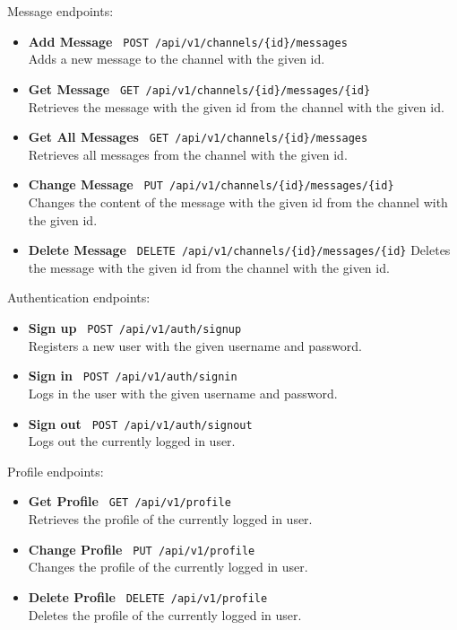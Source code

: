 \documentclass[a4paper,12pt]{article}
\begin{document}
	Message endpoints:
	\begin{itemize}
		\item \textbf{Add Message} \texttt{ POST /api/v1/channels/\{id\}/messages } \\
		Adds a new message to the channel with the given id.
		\item \textbf{Get Message} \texttt{ GET /api/v1/channels/\{id\}/messages/\{id\} } \\
		Retrieves the message with the given id from the channel with the given id.
		\item \textbf{Get All Messages} \texttt{ GET /api/v1/channels/\{id\}/messages } \\
		Retrieves all messages from the channel with the given id.
		\item \textbf{Change Message} \texttt{ PUT /api/v1/channels/\{id\}/messages/\{id\} } \\
		Changes the content of the message with the given id from the channel with the given id.
		\item \textbf{Delete Message} \texttt{ DELETE /api/v1/channels/\{id\}/messages/\{id\}}
		Deletes the message with the given id from the channel with the given id.
	\end{itemize}

	Authentication endpoints:
	\begin{itemize}
		\item \textbf{Sign up} \texttt{ POST /api/v1/auth/signup } \\
		Registers a new user with the given username and password.
		\item \textbf{Sign in} \texttt{ POST /api/v1/auth/signin } \\
		Logs in the user with the given username and password.
		\item \textbf{Sign out} \texttt{ POST /api/v1/auth/signout } \\
		Logs out the currently logged in user.
	\end{itemize}

	Profile endpoints:
	\begin{itemize}
		\item \textbf{Get Profile} \texttt{ GET /api/v1/profile } \\
		Retrieves the profile of the currently logged in user.
		\item \textbf{Change Profile} \texttt{ PUT /api/v1/profile } \\
		Changes the profile of the currently logged in user.
		\item \textbf{Delete Profile} \texttt{ DELETE /api/v1/profile } \\
		Deletes the profile of the currently logged in user.
	\end{itemize}
\end{document}
